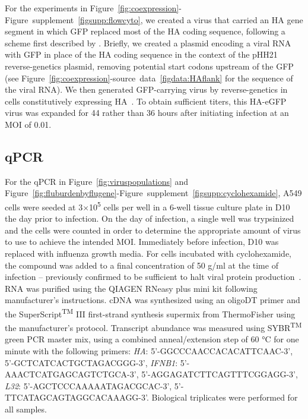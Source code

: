 \documentclass[9pt,lineno]{elife}
\begin{document}
For the experiments in Figure~\ref{fig:coexpression}-Figure~supplement~\ref{figsupp:flowcyto}, we created a virus that carried an HA gene segment in which GFP replaced most of the HA coding sequence, following a scheme first described by \citet{marsh2007specific}.
Briefly, we created a plasmid encoding a viral RNA with GFP in place of the HA coding sequence in the context of the pHH21~\citep{Neumann:1999ws} reverse-genetics plasmid, removing potential start codons upstream of the GFP (see Figure~\ref{fig:coexpression}-source~data~\ref{figdata:HAflank} for the sequence of the viral RNA).
We then generated GFP-carrying virus by reverse-genetics in cells constitutively expressing HA~\citep{Doud:2016gm}.
To obtain sufficient titers, this HA-eGFP virus was expanded for 44 rather than 36 hours after initiating infection at an MOI of 0.01.

\subsection{qPCR}
For the qPCR in Figure~\ref{fig:viruspopulations} and Figure~\ref{fig:fluburdenbyflugene}-Figure~supplement~\ref{figsupp:cyclohexamide}, A549 cells were seeded at 3$\times$10\textsuperscript{5} cells per well in a 6-well tissue culture plate in D10 the day prior to infection. 
On the day of infection, a single well was trypsinized and the cells were counted in order to determine the appropriate amount of virus to use to achieve the intended MOI.
Immediately before infection, D10 was replaced with influenza growth media.
For cells incubated with cyclohexamide, the compound was added to a final concentration of 50  \si{\micro}g/ml at the time of infection -- previously confirmed to be sufficient to halt viral protein production~\citep{Killip:2014kz}.
RNA was purified using the QIAGEN RNeasy plus mini kit following manufacturer's instructions. 
cDNA was synthesized using an oligoDT primer and the SuperScript\textsuperscript{TM} III first-strand synthesis supermix from ThermoFisher using the manufacturer's protocol. 
Transcript abundance was measured using SYBR\textsuperscript{TM} green PCR master mix, using a combined anneal/extension step of 60 \si{\degreeCelsius } for one minute with the following primers: \emph{HA}: 5'-GGCCCAACCACACATTCAAC-3', 5'-GCTCATCACTGCTAGACGGG-3', \emph{IFNB1}: 5'-AAACTCATGAGCAGTCTGCA-3', 5'-AGGAGATCTTCAGTTTCGGAGG-3', \emph{L32}: 5'-AGCTCCCAAAAATAGACGCAC-3', 5'-TTCATAGCAGTAGGCACAAAGG-3'.   
Biological triplicates were performed for all samples.
\end{document}
